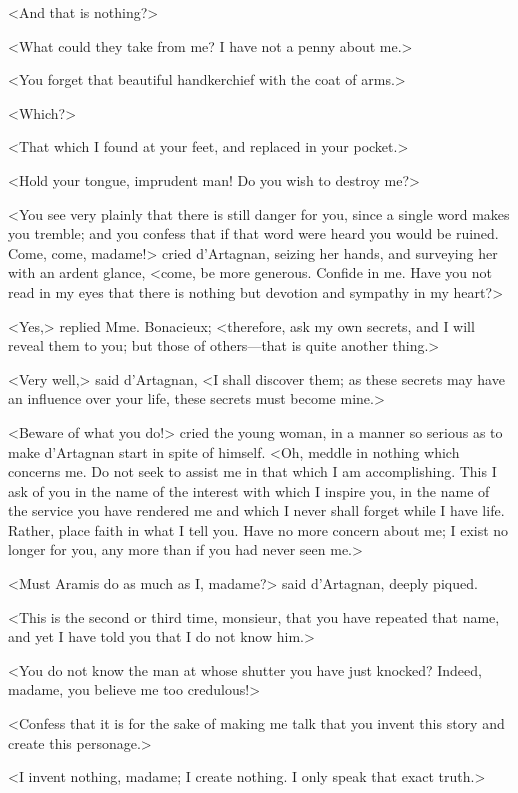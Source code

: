 <And that is nothing?> 

<What could they take from me? I have not a penny about me.> 

<You forget that beautiful handkerchief with the coat of arms.> 

<Which?> 

<That which I found at your feet, and replaced in your pocket.> 

<Hold your tongue, imprudent man! Do you wish to destroy me?> 

<You see very plainly that there is still danger for you, since a single word makes you tremble; and you confess that if that word were heard you would be ruined. Come, come, madame!> cried d'Artagnan, seizing her hands, and surveying her with an ardent glance, <come, be more generous. Confide in me. Have you not read in my eyes that there is nothing but devotion and sympathy in my heart?> 

<Yes,> replied Mme. Bonacieux; <therefore, ask my own secrets, and I will reveal them to you; but those of others---that is quite another thing.> 

<Very well,> said d'Artagnan, <I shall discover them; as these secrets may have an influence over your life, these secrets must become mine.> 

<Beware of what you do!> cried the young woman, in a manner so serious as to make d'Artagnan start in spite of himself. <Oh, meddle in nothing which concerns me. Do not seek to assist me in that which I am accomplishing. This I ask of you in the name of the interest with which I inspire you, in the name of the service you have rendered me and which I never shall forget while I have life. Rather, place faith in what I tell you. Have no more concern about me; I exist no longer for you, any more than if you had never seen me.> 

<Must Aramis do as much as I, madame?> said d'Artagnan, deeply piqued. 

<This is the second or third time, monsieur, that you have repeated that name, and yet I have told you that I do not know him.> 

<You do not know the man at whose shutter you have just knocked? Indeed, madame, you believe me too credulous!> 

<Confess that it is for the sake of making me talk that you invent this story and create this personage.> 

<I invent nothing, madame; I create nothing. I only speak that exact truth.> 

